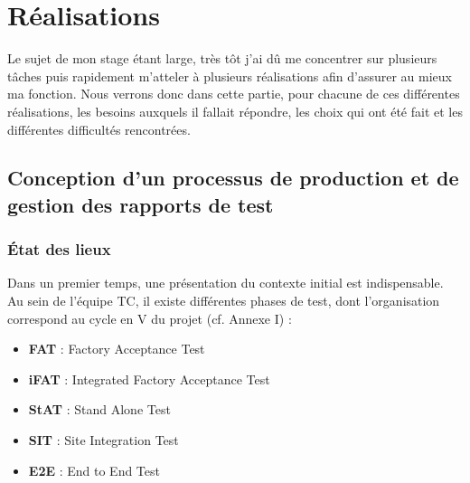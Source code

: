 \chapter{Réalisations}



Le sujet de mon stage étant large, très tôt j'ai dû me concentrer sur plusieurs tâches puis rapidement m'atteler à plusieurs réalisations afin d'assurer au mieux ma fonction. Nous verrons donc dans cette partie, pour chacune de ces différentes réalisations, les besoins auxquels il fallait répondre, les choix qui ont été fait et les différentes difficultés rencontrées.

\section{Conception d'un processus de production et de gestion des rapports de test}
\subsection{État des lieux}
Dans un premier temps, une présentation du contexte initial est indispensable. Au sein de l'équipe \gls{TC}, il existe différentes phases de test, dont l'organisation correspond au cycle en V du projet (cf. Annexe I) :
\begin{itemize}
\item \textbf{FAT} : Factory Acceptance Test
\item \textbf{iFAT} : Integrated Factory Acceptance Test
\item \textbf{\gls{StAT}} : Stand Alone Test
\item \textbf{\gls{SIT}} : Site Integration Test 
\item \textbf{\gls{E2E}} : End to End Test 
\end{itemize}

